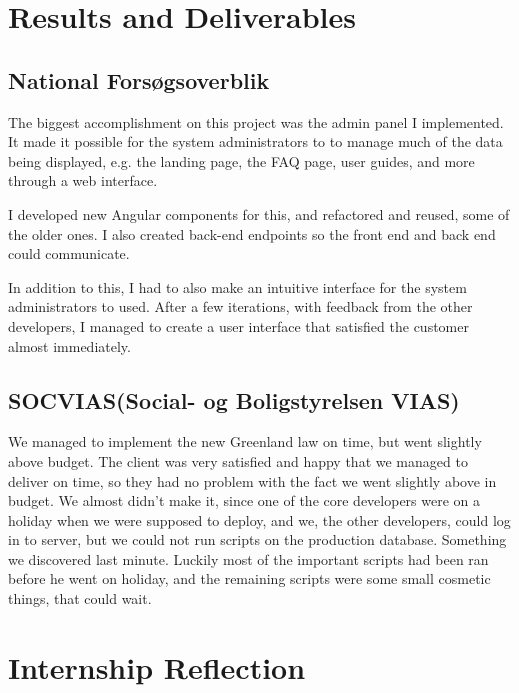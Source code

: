 \documentclass[../main.tex]{subfiles}
\begin{document}




\section{Results and Deliverables}
\label{sec:results}
\subsection{National Forsøgsoverblik}
The biggest accomplishment on this project was the admin panel I implemented. It made it possible for the system administrators to to manage much of the data being displayed, e.g. the landing page, the FAQ page, user guides, and more through a web interface. 

I developed new Angular components for this, and refactored and reused, some of the older ones. I also created back-end endpoints so the front end and back end could communicate. 

In addition to this, I had to also make an intuitive interface for the system administrators to used. After a few iterations, with feedback from the other developers, I managed to create a user interface that satisfied the customer almost immediately. 
\subsection{SOCVIAS(Social- og Boligstyrelsen VIAS)}

We managed to implement the new Greenland law on time, but went slightly above budget. The client was very satisfied and happy that we managed to deliver on time, so they had no problem with the fact we went slightly above in budget. We almost didn't make it, since one of the core developers were on a holiday when we were supposed to deploy, and we, the other developers, could log in to server, but we could not run scripts on the production database. Something we discovered last minute. Luckily most of the important scripts had been ran before he went on holiday, and the remaining scripts were some small cosmetic things, that could wait. 

\section{Internship Reflection}
\label{sec:reflection}
\end{document}
